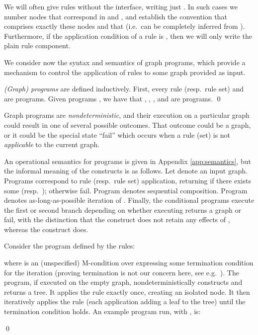 \documentclass{llncs}
\newcommand{\dder}{\Rightarrow}
\begin{document}
		We will often give rules without the interface, writing just . In such cases we number nodes that correspond in  and , and establish the convention that  comprises exactly these nodes and that  (i.e.\  can be completely inferred from ). Furthermore, if the application condition of a rule is , then we will only write the plain rule component.
		
		We consider now the syntax and semantics of graph programs, which provide a mechanism to control the application of rules to some graph provided as input.

			\begin{definition}\label{def:graph_program}\rm
				\emph{(Graph) programs} are defined inductively. First, every rule (resp.\ rule set)  and  are programs. Given programs , we have that , , , and  are programs.
				\qed
			\end{definition}

			Graph programs are \emph{nondeterministic}, and their execution on a particular graph could result in one of several possible outcomes. That outcome could be a graph, or it could be the special state ``fail'' which occurs when a rule (set) is not \emph{applicable} to the current graph.

			An operational semantics for programs is given in Appendix \ref{app:semantics}, but the informal meaning of the constructs is as follows. Let  denote an input graph. Programs  correspond to rule (resp.\ rule set) application, returning  if there exists some  (resp.\ ); otherwise fail. Program  denotes sequential composition. Program  denotes as-long-as-possible iteration of . Finally, the conditional programs execute the first or second branch depending on whether executing  returns a graph or fail, with the distinction that the  construct does not retain any effects of , whereas the  construct does.		


	\begin{example}\label{eg:grow_tree}\rm
		Consider the program  defined by the rules:


				\begin{center}
				\fbox{\emptyset\dder\dder


			}
		\end{center}


\noindent	where  is an (unspecified) M-condition over  expressing some termination condition for the iteration (proving termination is not our concern here, see e.g.\ \cite{Poskitt-Plump13a}). The program, if executed on the empty graph, nondeterministically constructs and returns a tree. It applies the rule  exactly once, creating an isolated node. It then iteratively applies the rule  (each application adding a leaf to the tree) until the termination condition  holds. An example program run, with , is:

	\qed
	\end{example}
	
\end{document}
